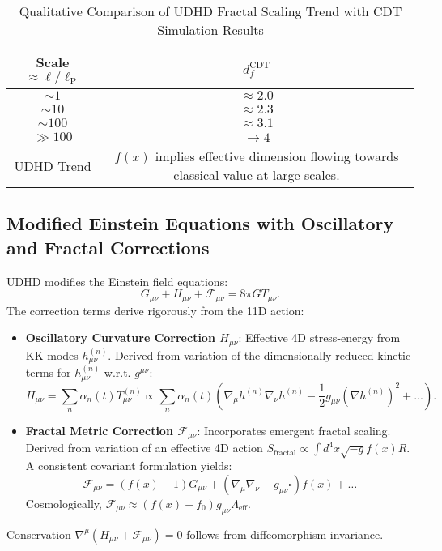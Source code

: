 \documentclass[12pt, a4paper]{article} %
\newcommand{\lplanck}{\ell_{\text{P}}}
\begin{document}
\begin{table}[h!]
    \centering
    \caption{Qualitative Comparison of UDHD Fractal Scaling Trend with CDT Simulation Results}
    \label{tab:fractal_sec2_revised_final_corrected_revised_ultra}
    \begin{tabular}{cc}
        \toprule
        Scale \( \approx \ell / \lplanck \) & \( d_f^{\text{CDT}} \) \cite{ambjorn2012quantum} \\
        \midrule
        \( \sim 1 \)   & \(\approx 2.0\) \\
        \( \sim 10 \)  & \(\approx 2.3\) \\
        \( \sim 100 \) & \(\approx 3.1\) \\
        \( \gg 100 \) & \(\to 4\) \\
        \midrule
        UDHD Trend & \(f(x)\) implies effective dimension flowing towards classical value at large scales. \\
        \bottomrule
    \end{tabular}
\end{table}

\subsection{Modified Einstein Equations with Oscillatory and Fractal Corrections}
UDHD modifies the Einstein field equations:
\begin{equation}
G_{\mu\nu} + H_{\mu\nu} + \mathcal{F}_{\mu\nu} = 8\pi G T_{\mu\nu}.
\label{eq:modified_einstein_sec2_ultra}
\end{equation}
The correction terms derive rigorously from the 11D action:
\begin{itemize}
    \item \textbf{Oscillatory Curvature Correction \(H_{\mu\nu}\)}: Effective 4D stress-energy from KK modes \(h_{\mu\nu}^{(n)}\). Derived from variation of the dimensionally reduced kinetic terms for \(h_{\mu\nu}^{(n)}\) w.r.t. \(g^{\mu\nu}\):
    \[
    H_{\mu\nu} = \sum_n \alpha_n(t) T_{\mu\nu}^{(n)} \propto \sum_n \alpha_n(t) \left( \nabla_\mu h^{(n)} \nabla_\nu h^{(n)} - \frac{1}{2} g_{\mu\nu} (\nabla h^{(n)})^2 + ... \right).
    \]
    \item \textbf{Fractal Metric Correction \(\mathcal{F}_{\mu\nu}\)}: Incorporates emergent fractal scaling. Derived from variation of an effective 4D action \(S_{\text{fractal}} \propto \int d^4x \sqrt{-g} f(x) R \). A consistent covariant formulation yields:
    \[
    \mathcal{F}_{\mu\nu} = (f(x) - 1) G_{\mu\nu} + (\nabla_\mu \nabla_\nu - g_{\mu\nu} \square) f(x) + \dots
    \]
    Cosmologically, \( \mathcal{F}_{\mu\nu} \approx (f(x) - f_0) g_{\mu\nu} \Lambda_{\text{eff}} \).
\end{itemize}
Conservation \( \nabla^\mu (H_{\mu\nu} + \mathcal{F}_{\mu\nu}) = 0 \) follows from diffeomorphism invariance.
\end{document}
